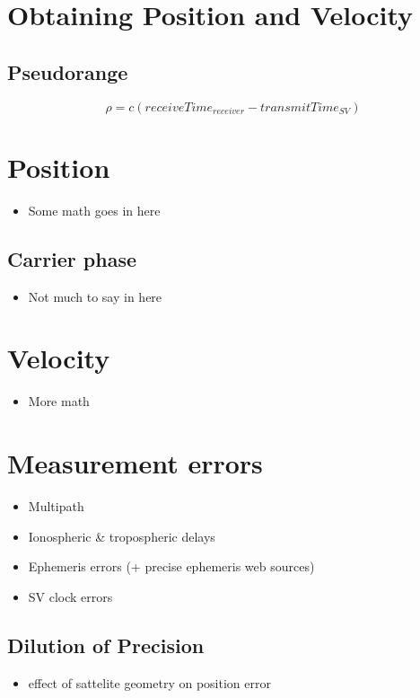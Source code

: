 \section{Obtaining Position and Velocity}

\subsection{Pseudorange}

%
\[\rho = c (receiveTime_{receiver} - transmitTime_{SV})\]
%

\section{Position}
\begin{itemize}
\item Some math goes in here
\end{itemize}

\subsection{Carrier phase}
\begin{itemize}
\item Not much to say in here
\end{itemize}

\section{Velocity}
\begin{itemize}
\item More math
\end{itemize}

\section{Measurement errors}
\begin{itemize}
\item Multipath
\item Ionospheric \& tropospheric delays
\item Ephemeris errors (+ precise ephemeris web sources)
\item SV clock errors
\end{itemize}

\subsection{Dilution of Precision}
\begin{itemize}
\item effect of sattelite geometry on position error
\end{itemize}

